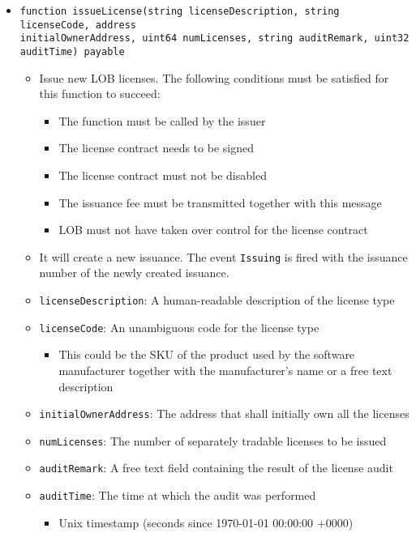 \documentclass[a4paper]{article}
\begin{document}
\begin{itemize}
  \item \texttt{function issueLicense(string licenseDescription, string licenseCode, address \\ initialOwnerAddress, uint64 numLicenses, string auditRemark, uint32 auditTime) payable}
  \begin{itemize}
    \item Issue new LOB licenses. The following conditions must be satisfied for this function to succeed:
    \begin{itemize}
      \item The function must be called by the issuer
      \item The license contract needs to be signed
      \item The license contract must not be disabled
      \item The issuance fee must be transmitted together with this message
      \item LOB must not have taken over control for the license contract
    \end{itemize}
    \item It will create a new issuance. The event \texttt{Issuing} is fired with the issuance number of the newly created issuance.
    \item \texttt{licenseDescription}: A human-readable description of the license type
    \item \texttt{licenseCode}: An unambiguous code for the license type
    \begin{itemize}
      \item This could be the SKU of the product used by the software manufacturer together with the manufacturer's name or a free text description
    \end{itemize}
    \item \texttt{initialOwnerAddress}: The address that shall initially own all the licenses
    \item \texttt{numLicenses}: The number of separately tradable licenses to be issued
    \item \texttt{auditRemark}: A free text field containing the result of the license audit
    \item \texttt{auditTime}: The time at which the audit was performed
    \begin{itemize}
      \item Unix timestamp (seconds since 1970-01-01 00:00:00 +0000)
    \end{itemize}
  \end{itemize}
  

\end{itemize}
\end{document}
